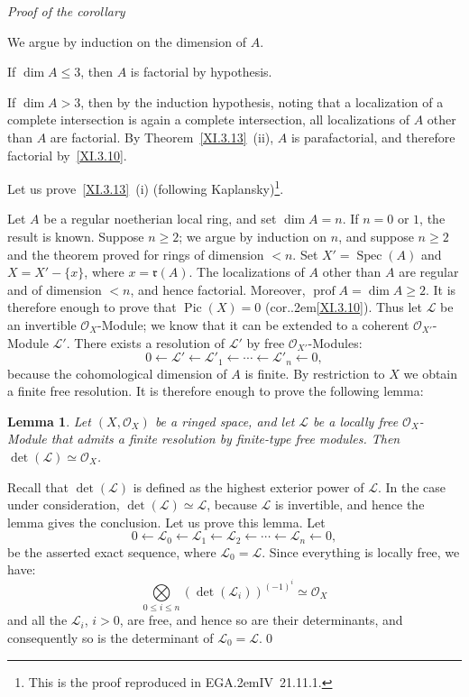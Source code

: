 \documentclass[11pt,a4paper,oneside]{book}
\providecommand{\sisi}[2]{#2}
\providecommand{\pageoriginale}{%
  \refstepcounter{pageoriginal}%
  \marginpar{\raggedright\footnotesize\bfseries\thepageoriginal}%
  \xspace}
\providecommand{\sfootnote}[1]{\footnote{#1}}
\providecommand{\EGA}{\textup{EGA}\kern.2em}
\providecommand{\ptbl}{.\kern.2em}
\providecommand{\quoi}{}
\providecommand{\Oo}{\mathcal O}
\providecommand{\ideal}[1]{\mathfrak{#1}}
\providecommand{\rr}{\ideal r}
\providecommand{\Lcal}{\mathcal L}
\providecommand{\OX}{\mathcal O_X}
\providecommand{\Spec}{\operatorname{Spec}}
\providecommand{\Pic}{\operatorname{Pic}}
\providecommand{\prof}{\operatorname{prof}}
\providecommand{\from}{\longleftarrow}
\providecommand{\tbigotimes}{\mathop{\textstyle\bigotimes}\limits}
\theoremstyle{plain}
\newtheorem{lemme}[subsection]{Lemma}
\theoremstyle{definition}
\theoremstyle{remark}
\renewcommand{\Ref}[1]{\textup{\ref{#1}}}
\begin{document}
\emph{Proof of the corollary}

We argue by induction on the dimension of $A$.

If $\dim A\leq 3$, then $A$ is factorial by hypothesis.

If $\dim A>3$, then by the induction hypothesis, noting that a localization of a complete intersection is again a complete intersection, all localizations of $A$ other than $A$ are factorial. By Theorem~\Ref{XI.3.13}~(ii), $A$ is parafactorial, and therefore factorial by~\Ref{XI.3.10}.

Let us prove~\Ref{XI.3.13}~(i) (following \sisi{KAPLANSKY}{Kaplansky})\sfootnote{This is the proof reproduced in \EGA IV~21.11.1.}.

Let $A$ be a regular noetherian local ring, and set $\dim A=n$. If $n=0$ or $1$, the result is known. Suppose $n\geq 2$; we argue by induction on $n$, and suppose $n\geq 2$ and the theorem proved for rings of dimension $<n$. Set $X'=\Spec(A)$ and $X=X'-\{x\}$, where $x=\rr(A)$. The localizations of $A$ other than $A$ are regular and of dimension $<n$, and hence factorial. Moreover, $\prof A = \dim A\geq 2$. It is therefore enough to prove that $\Pic(X)=0$ (cor\ptbl\Ref{XI.3.10}). Thus let ${\Lcal}$ be an invertible $\OX$-Module; we know that it can be extended to a coherent $\Oo_{X'}$-Module ${\Lcal}'$. There exists a resolution of ${\Lcal}'$ by free $\Oo_{X'}$-Modules:
\[
0\from {\Lcal}'\from {\Lcal}'_1\from\cdots\from{\Lcal}'_n\from 0{\quoi},
\]
because\pageoriginale the cohomological dimension of $A$ is finite. By restriction to $X$ we obtain a finite free resolution. It is therefore enough to prove the following lemma:

\begin{lemme} \label{XI.3.15} Let $(X, \OX)$ be a ringed space, and let ${\Lcal}$ be a locally free $\OX$-Module that admits a finite resolution by \emph{finite-type free} modules. Then $\det({\Lcal}) \simeq \OX$.
\end{lemme}

Recall that $\det({\Lcal})$ is defined as the highest exterior power of ${\Lcal}$. In the case under consideration, $\det({\Lcal}) \simeq{\Lcal}$, because ${\Lcal}$ is invertible, and hence the lemma gives the conclusion. Let us prove this lemma. Let
\[
0\from {\Lcal}_0\from {\Lcal}_1\from {\Lcal}_2\from\cdots\from{\Lcal}_n\from 0{\quoi},
\]
be the asserted exact sequence, where ${\Lcal}_0={\Lcal}$. Since everything is locally free, we have:
\[
\tbigotimes_{0\leq i\leq n}(\det({\Lcal}_i))^{(-1)^i} \simeq \OX
\]
and all the ${\Lcal}_i$, $i>0$, are free, and hence so are their determinants, and consequently so is the determinant of ${\Lcal}_0 = {\Lcal}$.\qed
\end{document}
